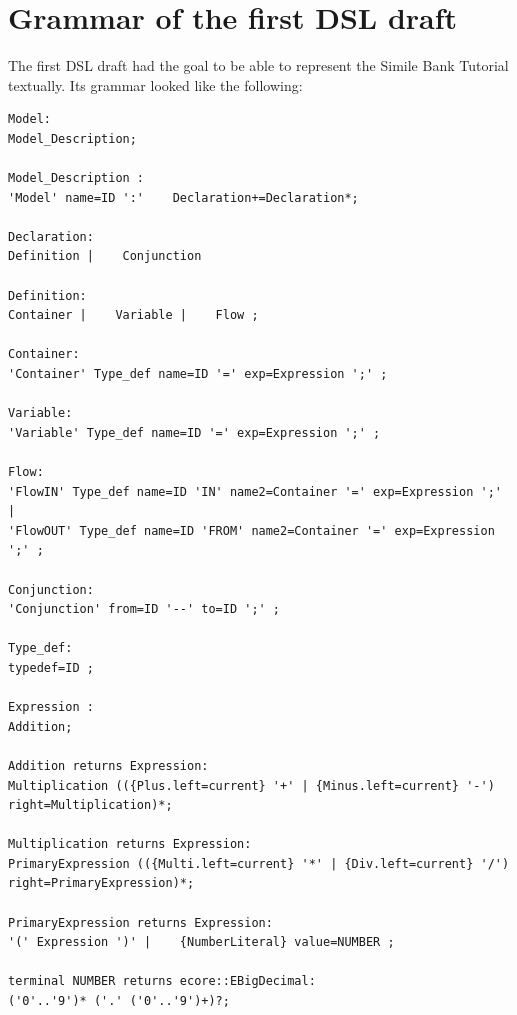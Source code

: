 \section{Grammar of the first DSL draft} \label{sec:first_dsl_draft}
\par
The first DSL draft had the goal to be able to represent the Simile Bank Tutorial \autocite{dsl:similie_tutorial_bank} textually. Its grammar looked like the following:
\begin{lstlisting}
Model:
Model_Description;

Model_Description :
'Model' name=ID ':'    Declaration+=Declaration*;

Declaration:
Definition |    Conjunction

Definition:
Container |    Variable |    Flow ;

Container:
'Container' Type_def name=ID '=' exp=Expression ';' ;

Variable:
'Variable' Type_def name=ID '=' exp=Expression ';' ;

Flow:
'FlowIN' Type_def name=ID 'IN' name2=Container '=' exp=Expression ';' |
'FlowOUT' Type_def name=ID 'FROM' name2=Container '=' exp=Expression ';' ;

Conjunction:
'Conjunction' from=ID '--' to=ID ';' ;

Type_def:
typedef=ID ;

Expression :
Addition;

Addition returns Expression:
Multiplication (({Plus.left=current} '+' | {Minus.left=current} '-') right=Multiplication)*;

Multiplication returns Expression:
PrimaryExpression (({Multi.left=current} '*' | {Div.left=current} '/') right=PrimaryExpression)*;

PrimaryExpression returns Expression:
'(' Expression ')' |    {NumberLiteral} value=NUMBER ;

terminal NUMBER returns ecore::EBigDecimal:
('0'..'9')* ('.' ('0'..'9')+)?;
\end{lstlisting}

